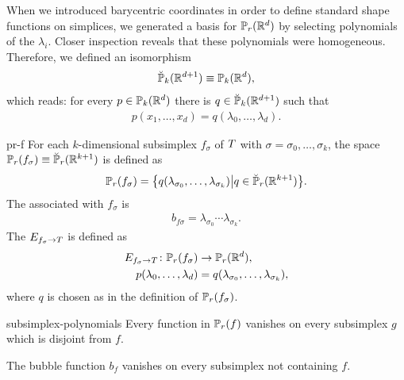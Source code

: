 \begin{remark}
  When we introduced barycentric coordinates in order to define
  standard shape functions on simplices, we generated a basis for
  $\P_r(\R^d)$ by selecting polynomials of the $\lambda_i$. Closer
  inspection reveals that these polynomials were
  homogeneous. Therefore, we defined an isomorphism
  \begin{gather}
    \breve \P_k(\R^{d+1}) \equiv \P_k(\R^d),
  \end{gather}
  which reads: for every $p\in \P_k(\R^d)$ there is
  $q\in\breve\P_k(\R^{d+1})$ such that
  \begin{gather}
    p(x_1,\dots,x_d) = q(\lambda_0,\dots,\lambda_d).
  \end{gather}
\end{remark}

\begin{Definition}{pr-f}
  For each $k$-dimensional subsimplex $f_\sigma$ of $\cell$ with
  $\sigma = \sigma_0,\dots,\sigma_k$, the space
  $\P_r(f_\sigma) \equiv \breve\P_r(\R^{k+1})$ is defined as
  \begin{gather}
    \P_r(f_\sigma) = \bigl\{
    q(\lambda_{\sigma_0},\dots,\lambda_{\sigma_k})\big\vert
    q\in\breve \P_r(\R^{k+1})\bigr\}.
  \end{gather}
  The  associated with $f_\sigma$ is
  \begin{gather}
    b_{f\sigma} = \lambda_{\sigma_0}\cdots\lambda_{\sigma_k}.
  \end{gather}
  The  $E_{f_\sigma\to\cell}$ is defined as
  \begin{gather}
    \begin{split}
      E_{f_\sigma\to\cell}\colon \P_r(f_\sigma) &\to \P_r(\R^d),\\
      p(\lambda_0,\dots,\lambda_d) &= q(\lambda_{\sigma_0},\dots,\lambda_{\sigma_k}),
    \end{split}
  \end{gather}
  where $q$ is chosen as in the definition of $\P_r(f_\sigma)$.
\end{Definition}

\begin{Lemma}{subsimplex-polynomials}
  Every function in $\P_r(f)$ vanishes on every subsimplex $g$ which
  is disjoint from $f$.

  The bubble function $b_f$ vanishes on every subsimplex not containing $f$.
\end{Lemma}


